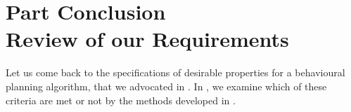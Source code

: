 \begin{subappendices}


%


\end{subappendices}


\chapter*{Part Conclusion\\ {\LARGE Review of our Requirements}}

Let us come back to the specifications of desirable properties for a behavioural planning algorithm, that we advocated in . In , we examine which of these criteria are met or not by the methods developed in .


